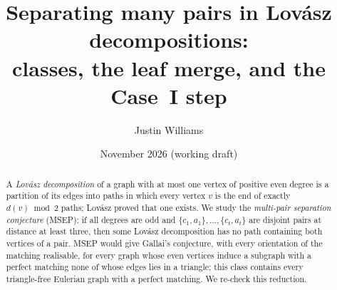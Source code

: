\documentclass[11pt]{amsart}
\title[Multi-pair separation]{Separating many pairs in Lov\'asz decompositions:\\
classes, the leaf merge, and the Case~I step}
\author{Justin Williams}
\date{November 2026 (working draft)}
\theoremstyle{definition}
\begin{document}
\begin{abstract}
A \emph{Lov\'asz decomposition} of a graph with at most one vertex of positive even degree is a
partition of its edges into paths in which every vertex $v$ is the end of exactly $d(v)\bmod 2$
paths; Lov\'asz proved that one exists. We study the \emph{multi-pair separation conjecture} (MSEP):
if all degrees are odd and $\{c_1,a_1\},\dots,\{c_t,a_t\}$ are disjoint pairs at distance at least three,
then some Lov\'asz decomposition has no path containing both vertices of a pair. MSEP would give
Gallai's conjecture, with every orientation of the matching realisable, for every graph whose even
vertices induce a subgraph with a perfect matching none of whose edges lies in a triangle; this class
contains every triangle-free Eulerian graph with a perfect matching. We re-check this reduction.


\end{abstract}
\end{document}

